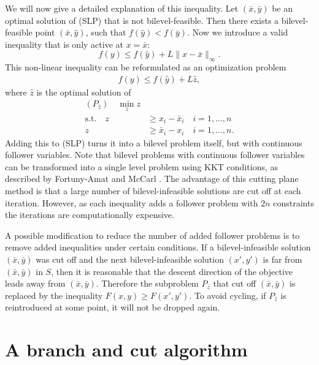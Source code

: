 \documentclass{article}
\begin{document}
We will now give a detailed explanation of this inequality. Let $(\bar x, \bar y)$ be an optimal solution of (SLP) that is not bilevel-feasible. Then there exists a bilevel-feasible point $(\bar x, \hat y)$, such that $f(\hat y) < f(\bar y)$. Now we introduce a valid inequality that is only active at $x = \bar x$:
\begin{equation*}
		f(y) \le f(\hat y) + L \|x-\bar x\|_{\infty}.
\end{equation*}
This non-linear inequality can be reformulated as an optimization problem 
\begin{align*}
f(y) \le f(\hat y) + L \hat z, 
\end{align*}
where $\hat z$ is the optimal solution of 
\begin{align*}
(P_{\hat z}) \quad \min_{z} z \\
\text{s.t.} \quad z &\ge x_i - \bar x_i \quad i = 1,\dots,n \\
z &\ge \bar x_i - x_i \quad i = 1,\dots,n.
\end{align*}
Adding this to (SLP) turns it into a bilevel problem itself, but with continuous follower variables.
Note that bilevel problems with continuous follower variables can be transformed into a single level problem using KKT conditions, as described by Fortuny-Amat
and McCarl \cite{Fortuny-Amat1981}.
The advantage of this cutting plane method is that a large number of bilevel-infeasible solutions are cut off at each iteration. However, as each inequality adds a follower problem with $2n$ constraints the iterations are computationally expensive.

A possible modification to reduce the number of added follower problems is to remove added inequalities under certain conditions. If a bilevel-infeasible solution $(\bar x, \bar y)$ was cut off and the next bilevel-infeasible solution $(x',y')$ is far from  $(\bar x, \bar y)$ in $S$, then it is reasonable that the descent direction of the objective leads away from $(\bar x, \bar y)$.
Therefore the subproblem $P_{\bar z}$ that cut off $(\bar x, \bar y)$ is replaced by the inequality $F(x,y) \ge F(x',y')$. To avoid cycling, if $P_{\bar z}$ is reintroduced at some point, it will not be dropped again.
\newpage

\section{A branch and cut algorithm}
\end{document}
